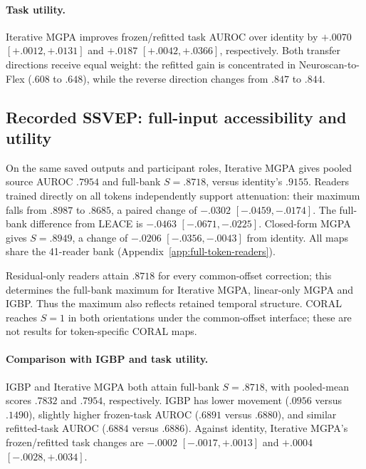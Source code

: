 \begin{table}[htbp]
\centering\small
\caption{\textbf{N170: MGPA versus IGBP at matched VAL budgets.}
First-crossing endpoints follow Appendix~\ref{app:gate-attribution};
attained EVAL movement $M$ may differ. Same ten participants and shared fits.}
\label{tab:igbp-budget}

\end{table}

\paragraph{Task utility.}
Iterative MGPA improves frozen/refitted task AUROC over identity by
$+.0070$ $[+.0012,+.0131]$ and $+.0187$ $[+.0042,+.0366]$, respectively.
Both transfer directions receive equal weight:
the refitted gain is concentrated in Neuroscan-to-Flex ($.608$ to $.648$),
while the reverse direction changes from $.847$ to $.844$.

\subsection{Recorded SSVEP: full-input accessibility and utility}
\label{app:recorded-full-input}
On the same saved outputs and participant roles, Iterative MGPA gives
pooled source AUROC $.7954$ and full-bank $S=.8718$, versus identity's
$.9155$. Readers trained directly on all tokens independently support
attenuation: their maximum falls from $.8987$ to $.8685$, a paired change
of $-.0302$ $[-.0459,-.0174]$. The full-bank difference from LEACE is
$-.0463$ $[-.0671,-.0225]$. Closed-form MGPA gives $S=.8949$, a change
of $-.0206$ $[-.0356,-.0043]$ from identity. All maps share the 41-reader bank
(Appendix~\ref{app:full-token-readers}).

Residual-only readers attain $.8718$ for every common-offset correction;
this determines the full-bank maximum for Iterative MGPA, linear-only MGPA
and IGBP. Thus the maximum also reflects retained temporal structure.
CORAL reaches $S=1$ in both orientations under the common-offset interface;
these are not results for token-specific CORAL maps.

\paragraph{Comparison with IGBP and task utility.}
IGBP and Iterative MGPA both attain full-bank $S=.8718$, with pooled-mean
scores $.7832$ and $.7954$, respectively. IGBP has lower movement
($.0956$ versus $.1490$), slightly higher frozen-task AUROC ($.6891$ versus
$.6880$), and similar refitted-task AUROC ($.6884$ versus $.6886$).
Against identity, Iterative MGPA's frozen/refitted task changes are
$-.0002$ $[-.0017,+.0013]$ and $+.0004$ $[-.0028,+.0034]$.

